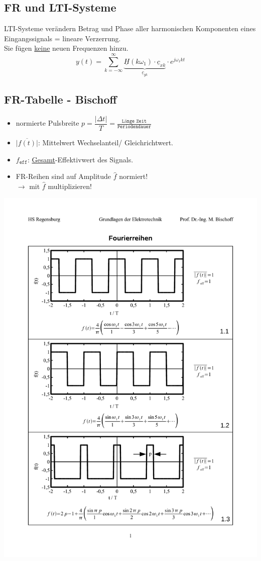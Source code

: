 \subsection{FR und LTI-Systeme}
{\small LTI-Systeme verändern Betrag und Phase aller harmonischen Komponenten eines Eingangssignals = lineare Verzerrung.\\
Sie fügen \underline{keine} neuen Frequenzen hinzu.}
\[
	y(t) = \sum_{k=-\infty}^{\infty} \underbrace{\underline{H}(k\omega_1)\cdot\underline{c}_{xk}}_{\underline{c}_{yk}} \cdot e^{j\omega_1 k t}
\]
\subsection{FR-Tabelle - Bischoff}
\begin{itemize}[leftmargin=*]
	\item normierte Pulsbreite $p=\dfrac{|\Delta t|}{T} = \frac{\texttt{Länge Zeit}}{\texttt{Periodendauer}}$
	\item $\overline{|f(t)|}$: Mittelwert Wechselanteil/ Gleichrichtwert.
	\item $f_{\texttt{eff}}$: \underline{Gesamt}-Effektivwert des Signals.
	\item FR-Reihen sind auf Amplitude $\hat{f}$ normiert!\\ $\rightarrow$ mit $\hat{f}$ multiplizieren!
\end{itemize}
\includegraphics[page=1,width=\columnwidth]{./Bilder/Fourierreihen_Bischoff_V2}
